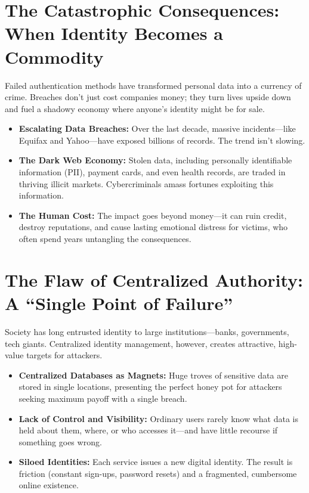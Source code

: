 \section{The Catastrophic Consequences: When Identity Becomes a Commodity}
Failed authentication methods have transformed personal data into a currency of crime. Breaches don’t just cost companies money; they turn lives upside down and fuel a shadowy economy where anyone’s identity might be for sale.

\begin{itemize}
    \item \textbf{Escalating Data Breaches:} Over the last decade, massive incidents—like Equifax and Yahoo—have exposed billions of records. The trend isn't slowing.
    \item \textbf{The Dark Web Economy:} Stolen data, including personally identifiable information (PII), payment cards, and even health records, are traded in thriving illicit markets. Cybercriminals amass fortunes exploiting this information.
    \item \textbf{The Human Cost:} The impact goes beyond money—it can ruin credit, destroy reputations, and cause lasting emotional distress for victims, who often spend years untangling the consequences.
\end{itemize}

\section{The Flaw of Centralized Authority: A ``Single Point of Failure''}
Society has long entrusted identity to large institutions—banks, governments, tech giants. Centralized identity management, however, creates attractive, high-value targets for attackers.

\begin{itemize}
    \item \textbf{Centralized Databases as Magnets:} Huge troves of sensitive data are stored in single locations, presenting the perfect honey pot for attackers seeking maximum payoff with a single breach.
    \item \textbf{Lack of Control and Visibility:} Ordinary users rarely know what data is held about them, where, or who accesses it—and have little recourse if something goes wrong.
    \item \textbf{Siloed Identities:} Each service issues a new digital identity. The result is friction (constant sign-ups, password resets) and a fragmented, cumbersome online existence.
\end{itemize}

